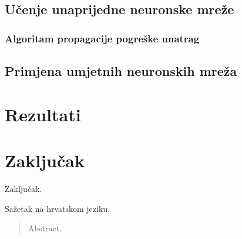\documentclass[times, utf8, zavrsni]{fer}
\begin{document}
\section{Učenje unaprijedne neuronske mreže}

\subsection{Algoritam propagacije pogreške unatrag}

\section{Primjena umjetnih neuronskih mreža}

\chapter{Rezultati}

\chapter{Zaključak}
Zaključak.



\nocite{*}

\begin{sazetak}
Sažetak na hrvatskom jeziku.

\end{sazetak}

\begin{abstract}
Abstract.

\end{abstract}
\end{document}
